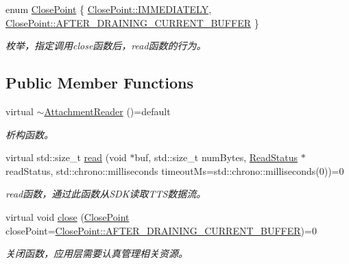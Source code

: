 \begin{DoxyCompactItemize}
enum \hyperlink{classduerOSDcsSDK_1_1sdkInterfaces_1_1AttachmentReader_a16bb338aa4735c8f4414ae1708b293a3}{Close\+Point} \{ \hyperlink{classduerOSDcsSDK_1_1sdkInterfaces_1_1AttachmentReader_a16bb338aa4735c8f4414ae1708b293a3ad051319484a869ba5244878e7ed93b8d}{Close\+Point\+::\+I\+M\+M\+E\+D\+I\+A\+T\+E\+LY}, 
\hyperlink{classduerOSDcsSDK_1_1sdkInterfaces_1_1AttachmentReader_a16bb338aa4735c8f4414ae1708b293a3ac7b7279c5169b23f95b28bd9e9437b79}{Close\+Point\+::\+A\+F\+T\+E\+R\+\_\+\+D\+R\+A\+I\+N\+I\+N\+G\+\_\+\+C\+U\+R\+R\+E\+N\+T\+\_\+\+B\+U\+F\+F\+ER}
 \}
\begin{DoxyCompactList}\small\item\em 枚举，指定调用close函数后，read函数的行为。 \end{DoxyCompactList}\end{DoxyCompactItemize}
\subsection*{Public Member Functions}
\begin{DoxyCompactItemize}
\item 
\mbox{\label{classduerOSDcsSDK_1_1sdkInterfaces_1_1AttachmentReader_a0524e068572417466c220cb44c27fd9a}} 
virtual \hyperlink{classduerOSDcsSDK_1_1sdkInterfaces_1_1AttachmentReader_a0524e068572417466c220cb44c27fd9a}{$\sim$\+Attachment\+Reader} ()=default
\begin{DoxyCompactList}\small\item\em 析构函数。 \end{DoxyCompactList}\item 
virtual std\+::size\+\_\+t \hyperlink{classduerOSDcsSDK_1_1sdkInterfaces_1_1AttachmentReader_a8e3e1a18275e89086c1b972401a98e38}{read} (void $\ast$buf, std\+::size\+\_\+t num\+Bytes, \hyperlink{classduerOSDcsSDK_1_1sdkInterfaces_1_1AttachmentReader_af6f8eba4943349ffd1588d56e4b9e4ab}{Read\+Status} $\ast$read\+Status, std\+::chrono\+::milliseconds timeout\+Ms=std\+::chrono\+::milliseconds(0))=0
\begin{DoxyCompactList}\small\item\em read函数，通过此函数从\+S\+D\+K读取\+T\+T\+S数据流。 \end{DoxyCompactList}\item 
virtual void \hyperlink{classduerOSDcsSDK_1_1sdkInterfaces_1_1AttachmentReader_a9660710b89712142a451236144968acc}{close} (\hyperlink{classduerOSDcsSDK_1_1sdkInterfaces_1_1AttachmentReader_a16bb338aa4735c8f4414ae1708b293a3}{Close\+Point} close\+Point=\hyperlink{classduerOSDcsSDK_1_1sdkInterfaces_1_1AttachmentReader_a16bb338aa4735c8f4414ae1708b293a3ac7b7279c5169b23f95b28bd9e9437b79}{Close\+Point\+::\+A\+F\+T\+E\+R\+\_\+\+D\+R\+A\+I\+N\+I\+N\+G\+\_\+\+C\+U\+R\+R\+E\+N\+T\+\_\+\+B\+U\+F\+F\+ER})=0
\begin{DoxyCompactList}\small\item\em 关闭函数，应用层需要认真管理相关资源。 \end{DoxyCompactList}\end{DoxyCompactItemize}


